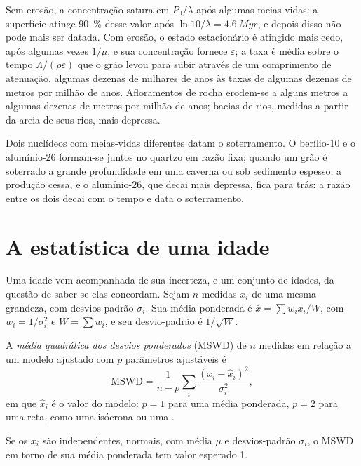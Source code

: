 Sem erosão, a concentração satura em $P_0/\lambda$ após algumas meias-vidas: a
superfície atinge \qty{90}{\percent} desse valor após $\ln 10/\lambda
= \qty{4.6}{Myr}$, e depois disso não pode mais ser datada. Com erosão, o
estado estacionário é atingido mais cedo, após algumas vezes $1/\mu$, e sua
concentração fornece $\varepsilon$; a taxa é média sobre o tempo
$\Lambda/(\rho\varepsilon)$ que o grão levou para subir através de um
comprimento de atenuação, algumas dezenas de milhares de anos às taxas de
algumas dezenas de metros por milhão de anos. Afloramentos de rocha
erodem-se a alguns metros a algumas dezenas de metros por milhão de anos; bacias
de rios, medidas a partir da areia de seus rios, mais depressa.

Dois nuclídeos com meias-vidas diferentes datam o soterramento. O berílio-10 e
o alumínio-26 formam-se juntos no quartzo em razão fixa; quando um grão é
soterrado a grande profundidade em uma caverna ou sob sedimento espesso, a
produção cessa, e o alumínio-26, que decai mais depressa, fica para trás: a
razão entre os dois decai com o tempo e data o soterramento.

\section{A estatística de uma idade}\label{sec:b3:advanced-geochronology:statistics}

Uma idade vem acompanhada de sua incerteza, e um conjunto de idades, da questão
de saber se elas concordam. Sejam $n$ medidas $x_i$ de uma mesma grandeza, com
desvios-padrão $\sigma_i$. Sua média ponderada é $\bar x = \sum w_ix_i/W$, com
$w_i = 1/\sigma_i^2$ e $W = \sum w_i$, e seu desvio-padrão é
$1/\sqrt W$.

\begin{definition}\label{def:b3:advanced-geochronology:mswd}
A \emph{média quadrática dos desvios ponderados}
(MSWD) de $n$ medidas em relação a um modelo ajustado com $p$ parâmetros
ajustáveis é
\[
\mathrm{MSWD} = \frac{1}{n - p}\sum_i \frac{(x_i - \hat x_i)^2}{\sigma_i^2},
\]
em que $\hat x_i$ é o valor do modelo: $p = 1$ para uma média ponderada, $p = 2$ para
uma reta, como uma isócrona ou uma .
\end{definition}

\begin{proposition}\label{prop:b3:advanced-geochronology:mswd}
Se os $x_i$ são independentes, normais, com média $\mu$ e desvios-padrão
$\sigma_i$, o MSWD em torno de sua média ponderada tem valor esperado 1.
\end{proposition}

